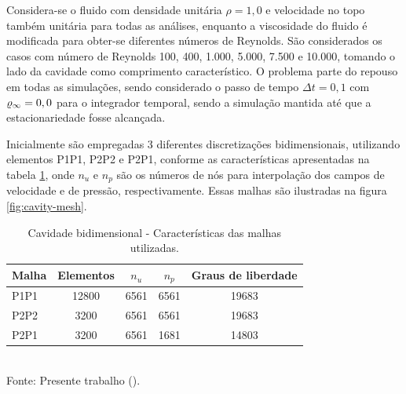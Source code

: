Considera-se o fluido com densidade unitária $\rho=1,0$ e velocidade no topo também unitária para todas as análises, enquanto a viscosidade do fluido é modificada para obter-se diferentes números de Reynolds. São considerados os casos com número de Reynolds 100, 400, 1.000, 5.000, 7.500 e 10.000, tomando o lado da cavidade como comprimento característico. O problema parte do repouso em todas as simulações, sendo considerado o passo de tempo $\Delta t=0,1$ com $\varrho_\infty=0,0$ para o integrador temporal, sendo a simulação mantida até que a estacionariedade fosse alcançada.

Inicialmente são empregadas 3 diferentes discretizações bidimensionais, utilizando elementos P1P1, P2P2 e P2P1, conforme as características apresentadas na tabela \ref{tab:cavity-mesh}, onde $n_u$ e $n_p$ são os números de nós para interpolação dos campos de velocidade e de pressão, respectivamente. Essas malhas são ilustradas na figura \ref{fig:cavity-mesh}.

\begin{table}[h!]
    \centering
    \caption{Cavidade bidimensional - Características das malhas utilizadas.}
    \begin{tabular}{lcccc}
        \hline
        Malha & Elementos & $n_u$ & $n_p$ & Graus de liberdade \\\hline
        P1P1  & 12800     & 6561  & 6561  & 19683              \\
        P2P2  & 3200      & 6561  & 6561  & 19683              \\
        P2P1  & 3200      & 6561  & 1681  & 14803              \\\hline
    \end{tabular}
    \\Fonte: Presente trabalho (\the\year).
    \label{tab:cavity-mesh}
\end{table}

